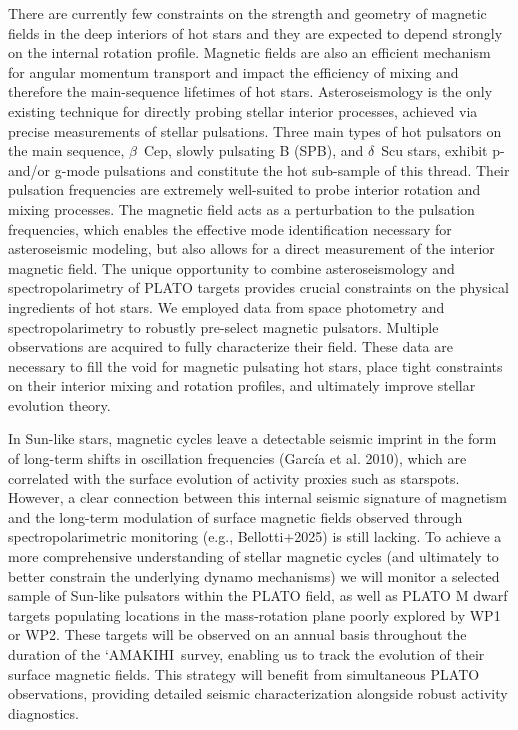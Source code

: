 \documentclass[
    traditabstract,
    longauth,
    onecolumn,
]{aa}
\def \amakihi{`AMAKIHI}
\begin{document}
There are currently few constraints on the strength and geometry of magnetic fields in the deep interiors of hot stars and they are expected to depend strongly on the internal rotation profile. Magnetic fields are also an efficient mechanism for angular momentum transport and impact the efficiency of mixing and therefore the main-sequence lifetimes of hot stars. Asteroseismology is the only existing technique for directly probing stellar interior processes, achieved via precise measurements of stellar pulsations. Three main types of hot pulsators on the main sequence, $\beta$~Cep, slowly pulsating B (SPB), and $\delta$~Scu stars, exhibit p- and/or g-mode pulsations and constitute the hot sub-sample of this thread. Their pulsation frequencies are extremely well-suited to probe interior rotation and mixing processes. The magnetic field acts as a perturbation to the pulsation frequencies, which enables the effective mode identification necessary for asteroseismic modeling, but also allows for a direct measurement of the interior magnetic field. The unique opportunity to combine asteroseismology and spectropolarimetry of PLATO targets provides crucial constraints on the physical ingredients of hot stars.
We employed data from space photometry and spectropolarimetry to robustly pre-select magnetic pulsators. Multiple observations are acquired to fully characterize their field. These data are necessary to fill the void for magnetic pulsating hot stars, place tight constraints on their interior mixing and rotation profiles, and ultimately improve stellar evolution theory.

In Sun-like stars, magnetic cycles leave a detectable seismic imprint in the form of long-term shifts in oscillation frequencies (García et al. 2010), which are correlated with the surface evolution of activity proxies such as starspots. However, a clear connection between this internal seismic signature of magnetism and the long-term modulation of surface magnetic fields observed through spectropolarimetric monitoring (e.g., Bellotti+2025) is still lacking. To achieve a more comprehensive understanding of stellar magnetic cycles (and ultimately to better constrain the underlying dynamo mechanisms) we will monitor a selected sample of Sun-like pulsators within the PLATO field, as well as PLATO M dwarf targets populating locations in the mass-rotation plane poorly explored by WP1 or WP2. These targets will be observed on an annual basis throughout the duration of the \amakihi\ survey, enabling us to track the evolution of their surface magnetic fields. This strategy will benefit from simultaneous PLATO observations, providing detailed seismic characterization alongside robust activity diagnostics.\\
\end{document}

